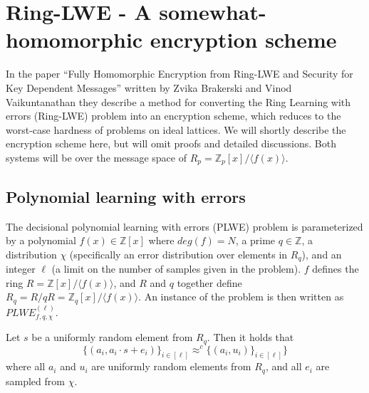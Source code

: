 \documentclass[../main.tex]{subfiles}
\begin{document}
\section{Ring-LWE - A somewhat-homomorphic encryption scheme} \label{sec:RLWE-theory}

In the paper ``Fully Homomorphic Encryption from Ring-LWE and Security for Key Dependent Messages'' written by
Zvika Brakerski and Vinod Vaikuntanathan \cite{brakerski2011fully}
they describe a method for converting the Ring Learning with errors (Ring-LWE) problem into an encryption scheme,
which reduces to the worst-case hardness of problems on ideal lattices.
We will shortly describe the encryption scheme here, but will omit proofs and detailed discussions.
Both systems will be over the message space of $R_p = \mathbb{Z}_p[x] / \langle f(x) \rangle$.


\subsection{Polynomial learning with errors}

The decisional polynomial learning with errors (PLWE) problem is parameterized by a polynomial $f(x) \in \mathbb{Z}[x]$ where $deg(f) = N$, a prime $q \in \mathbb{Z}$, a distribution $\chi$ (specifically an error distribution over elements in $R_q$), and an integer $\ell$ (a limit on the number of samples given in the problem).
$f$ defines the ring $R = \mathbb{Z}[x] / \langle f(x) \rangle$, and $R$ and $q$ together define $R_q = R / q R = \mathbb{Z}_q[x] / \langle f(x) \rangle$.
An instance of the problem is then written as $PLWE_{f, q, \chi}^{(\ell)}$.

\begin{definition}
    Let $s$ be a uniformly random element from $R_q$.
    Then it holds that 
    \[
        \{ (a_i, a_i \cdot s + e_i) \}_{i \in [\ell]} \approx^{c} \{(a_i, u_i) \}_{i \in [\ell]}\}
    \]
    where all $a_i$ and $u_i$ are uniformly random elements from $R_q$, and all $e_i$ are sampled from $\chi$.
\end{definition}
\end{document}
